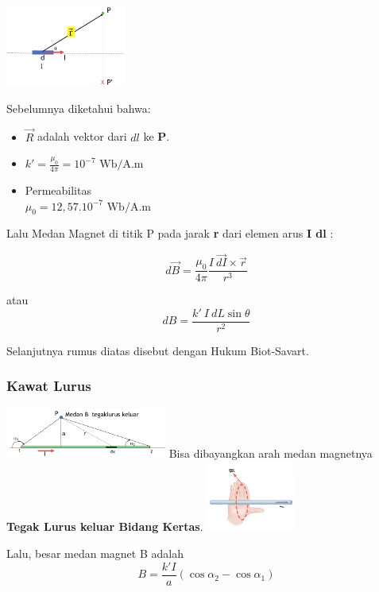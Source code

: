 \documentclass[twocolumn, 11pt]{article}%
\begin{document}
\begin{center}
    \includegraphics[width=150px]{3.png}
\end{center}

Sebelumnya diketahui bahwa:\\
\begin{itemize}
    \item $\vec R$ adalah vektor dari $dl$ ke \textbf{P}.
    \item $\displaystyle k'=\frac{\mu_0}{4\pi}=10^{-7} \text{ Wb/A.m}$
    \item Permeabilitas\\
          $\mu_0=12,57.10^{-7} \text{ Wb/A.m}$
\end{itemize}

Lalu Medan Magnet di titik P pada jarak \textbf{r} dari elemen arus
\textbf{I dl} :

\[d\vec B = \frac{\mu_0}{4\pi} \frac{I\
\overrightarrow{dI}\times \vec r}{r^3} \]

atau
\[dB = \frac{k'\ I\ dL\sin \theta}{r^2} \]

Selanjutnya rumus diatas disebut dengan Hukum Biot-Savart.

\subsubsection{Kawat Lurus}%
\begin{center}
    \includegraphics[width=200px]{4.png}
    Bisa dibayangkan arah medan magnetnya \textbf{Tegak Lurus keluar
    Bidang Kertas}.
    \includegraphics[width=110px]{5.png}
\end{center}

Lalu, besar medan magnet B adalah
\[B=\frac{k'I}{a}(\cos \alpha_2 - \cos \alpha_1)\]
\end{document}
